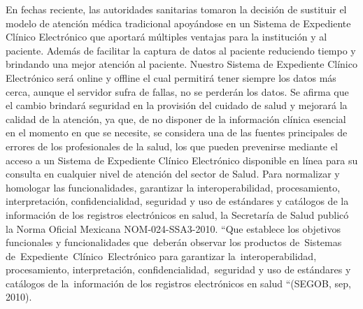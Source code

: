 En fechas reciente, las autoridades sanitarias tomaron la decisión de sustituir el modelo de atención médica tradicional apoyándose en un Sistema de Expediente Clínico Electrónico que aportará múltiples ventajas para la institución y al paciente. Además de facilitar la captura de datos al paciente reduciendo tiempo y brindando una mejor atención al paciente. Nuestro Sistema de Expediente Clínico Electrónico será online y offline el cual permitirá tener siempre los datos más cerca, aunque el servidor sufra de fallas, no se perderán los datos. Se afirma que el cambio brindará seguridad en la provisión del cuidado de salud y mejorará la calidad de la atención, ya que, de no disponer de la información clínica esencial en el momento en que se necesite, se considera una de las fuentes principales de errores de los profesionales de la salud, los que pueden prevenirse mediante el acceso a un Sistema de Expediente Clínico Electrónico disponible en línea para su consulta en cualquier nivel de atención del sector de Salud. Para normalizar y homologar las funcionalidades, garantizar la interoperabilidad, procesamiento, interpretación, confidencialidad, seguridad y uso de estándares y catálogos de la información de los registros electrónicos en salud, la Secretaría de Salud publicó la Norma Oficial Mexicana NOM-024-SSA3-2010.  “Que establece los objetivos funcionales y funcionalidades que deberán observar los productos de Sistemas de Expediente Clínico Electrónico para garantizar la interoperabilidad, procesamiento, interpretación, confidencialidad, seguridad y uso de estándares y catálogos de la información de los registros electrónicos en salud “(SEGOB, sep, 2010).
